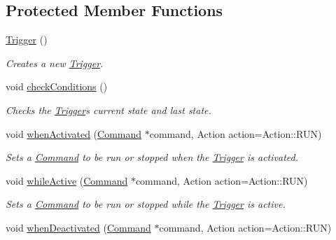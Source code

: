 \subsection*{Protected Member Functions}
\begin{DoxyCompactItemize}
\item 
\mbox{\hyperlink{classlib_iterative_robot_1_1_trigger_afcf974790b6e846cd89eba5a802e7fa5}{Trigger}} ()
\begin{DoxyCompactList}\small\item\em Creates a new \mbox{\hyperlink{classlib_iterative_robot_1_1_trigger}{Trigger}}. \end{DoxyCompactList}\item 
void \mbox{\hyperlink{classlib_iterative_robot_1_1_trigger_ac89c07cd514a1af516dd7f773cbedcab}{check\+Conditions}} ()
\begin{DoxyCompactList}\small\item\em Checks the \mbox{\hyperlink{classlib_iterative_robot_1_1_trigger}{Trigger}}\textquotesingle{}s current state and last state. \end{DoxyCompactList}\item 
void \mbox{\hyperlink{classlib_iterative_robot_1_1_trigger_a1e98ebb42428b05ccab7dda82b9e58dc}{when\+Activated}} (\mbox{\hyperlink{classlib_iterative_robot_1_1_command}{Command}} $\ast$command, Action action=Action\+::\+R\+UN)
\begin{DoxyCompactList}\small\item\em Sets a \mbox{\hyperlink{classlib_iterative_robot_1_1_command}{Command}} to be run or stopped when the \mbox{\hyperlink{classlib_iterative_robot_1_1_trigger}{Trigger}} is activated. \end{DoxyCompactList}\item 
void \mbox{\hyperlink{classlib_iterative_robot_1_1_trigger_a66c9e7fe16d1907aed3f7b3c51bb8917}{while\+Active}} (\mbox{\hyperlink{classlib_iterative_robot_1_1_command}{Command}} $\ast$command, Action action=Action\+::\+R\+UN)
\begin{DoxyCompactList}\small\item\em Sets a \mbox{\hyperlink{classlib_iterative_robot_1_1_command}{Command}} to be run or stopped while the \mbox{\hyperlink{classlib_iterative_robot_1_1_trigger}{Trigger}} is active. \end{DoxyCompactList}\item 
void \mbox{\hyperlink{classlib_iterative_robot_1_1_trigger_a6459a2d4d3ca0903bb88102d0752a419}{when\+Deactivated}} (\mbox{\hyperlink{classlib_iterative_robot_1_1_command}{Command}} $\ast$command, Action action=Action\+::\+R\+UN)

\end{DoxyCompactItemize}
